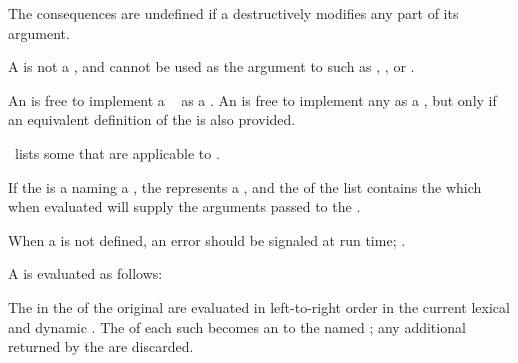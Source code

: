 The consequences are undefined if a  destructively modifies
any part of its  argument.

A  is not a ,
and cannot be used as the  argument to  
such as , , or .

An  is free to implement a \clisp\ 
as a .  An  is free to implement any
  as a , but only
if an equivalent definition of the  is also provided.

\Thenextfigure\ lists some  that are applicable
to .


\endsubsubsubsubsection%


If the  is a  naming a ,
the  represents a ,
and the  of the list contains the  
which when evaluated will supply the arguments passed to the .

When a  is not defined, 
an error  should be signaled at run time;
\seesection\SemanticConstraints.

A  is evaluated as follows:

The  in the  of the original 
are evaluated in left-to-right order in the current lexical and 
dynamic .  The  of each
such  becomes an  to the named ;
any additional  returned by the  are discarded.

